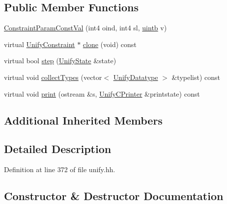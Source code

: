 \subsection*{Public Member Functions}
\begin{DoxyCompactItemize}
\item 
\mbox{\hyperlink{class_constraint_param_const_val_a2cab2fc24885c66649a505fb626bef39}{Constraint\+Param\+Const\+Val}} (int4 oind, int4 sl, \mbox{\hyperlink{types_8h_a2db313c5d32a12b01d26ac9b3bca178f}{uintb}} v)
\item 
virtual \mbox{\hyperlink{class_unify_constraint}{Unify\+Constraint}} $\ast$ \mbox{\hyperlink{class_constraint_param_const_val_a74c4f987687e1919f47c1b1d30b303da}{clone}} (void) const
\item 
virtual bool \mbox{\hyperlink{class_constraint_param_const_val_aab6146036d543edc207f16a75532f0b7}{step}} (\mbox{\hyperlink{class_unify_state}{Unify\+State}} \&state)
\item 
virtual void \mbox{\hyperlink{class_constraint_param_const_val_a7e43f8b626eae12d4a2c3df1d9b63483}{collect\+Types}} (vector$<$ \mbox{\hyperlink{class_unify_datatype}{Unify\+Datatype}} $>$ \&typelist) const
\item 
virtual void \mbox{\hyperlink{class_constraint_param_const_val_a77b6c5d0d0182a1c6b31e823f954266c}{print}} (ostream \&s, \mbox{\hyperlink{class_unify_c_printer}{Unify\+C\+Printer}} \&printstate) const
\end{DoxyCompactItemize}
\subsection*{Additional Inherited Members}


\subsection{Detailed Description}


Definition at line 372 of file unify.\+hh.



\subsection{Constructor \& Destructor Documentation}
\mbox{\label{class_constraint_param_const_val_a2cab2fc24885c66649a505fb626bef39}} 
